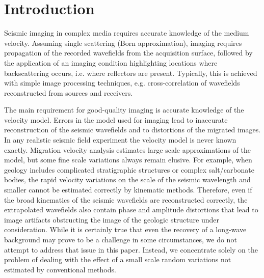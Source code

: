 \section{Introduction}
Seismic imaging in complex media requires accurate knowledge of the
medium velocity. Assuming single scattering (Born approximation),
imaging requires propagation of the recorded wavefields from the
acquisition surface, followed by the application of an imaging
condition highlighting locations where backscattering occurs,
i.e. where reflectors are present. Typically, this is achieved with
simple image processing techniques, e.g. cross-correlation of
wavefields reconstructed from sources and receivers.

The main requirement for good-quality imaging is accurate knowledge of
the velocity model. Errors in the model used for imaging lead to
inaccurate reconstruction of the seismic wavefields and to distortions
of the migrated images. In any realistic seismic field experiment the
velocity model is never known exactly. Migration velocity analysis
estimates large scale approximations of the model, but some fine scale
variations always remain elusive. For example, when geology includes
complicated stratigraphic structures or complex salt/carbonate bodies,
the rapid velocity variations on the scale of the seismic wavelength
and smaller cannot be estimated correctly by kinematic
methods. Therefore, even if the broad kinematics of the seismic
wavefields are reconstructed correctly, the extrapolated wavefields
also contain phase and amplitude distortions that lead to image
artifacts obstructing the image of the geologic structure under
consideration. While it is certainly true that even the recovery of a
long-wave background may prove to be a challenge in some
circumstances, we do not attempt to address that issue in this
paper. Instead, we concentrate solely on the problem of dealing with
the effect of a small scale random variations not estimated by
conventional methods.

